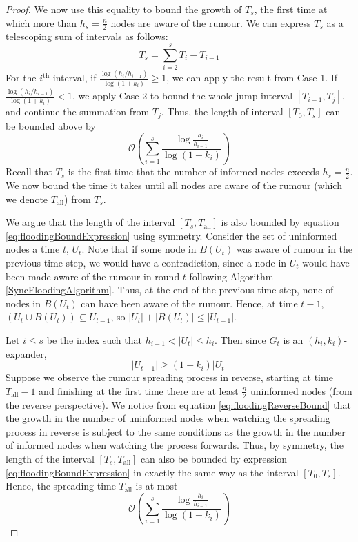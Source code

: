 \begin{proof}
	We now use this equality to bound the growth of $T_s$, the first time at which more than $h_s = \frac{n}{2}$ nodes are aware of the rumour. We can express $T_s$ as a telescoping sum of intervals as follows:
	$$
		T_s = \sum_{i=2}^s T_i - T_{i-1}
	$$
	For the $i^\text{th}$ interval, if $\frac{\log (h_i/h_{i-1})}{\log(1+k_i)} \geq 1$, we can apply the result from Case 1. If $\frac{\log (h_i/h_{i-1})}{\log(1+k_i)} < 1$, we apply Case 2 to bound the whole jump interval $[T_{i-1}, T_j]$, and continue the summation from $T_j$.
	Thus, the length of interval $[T_0, T_s]$ can be bounded above by
	\begin{equation}\label{eq:floodingBoundExpression}
		\mathcal{O}\left(\sum_{i=1}^s \frac{\log \frac{h_i}{h_{i-1}}}{\log(1+k_i)}\right)
	\end{equation}
	Recall that $T_s$ is the first time that the number of informed nodes exceeds $h_s = \frac{n}{2}$. We now bound the time it takes until all nodes are aware of the rumour (which we denote $T_\text{all}$) from $T_s$.

	We argue that the length of the interval $[T_s, T_\text{all}]$ is also bounded by equation \ref{eq:floodingBoundExpression} using symmetry. Consider the set of uninformed nodes a time $t$, $U_t$. Note that if some node in $B(U_t)$ was aware of rumour in the previous time step, we would have a contradiction, since a node in $U_t$ would have been made aware of the rumour in round $t$ following Algorithm \ref{SyncFloodingAlgorithm}.
	Thus, at the end of the previous time step, none of nodes in $B(U_t)$ can have been aware of the rumour.
	Hence, at time $t-1$, $(U_t \cup B(U_t)) \subseteq U_{t-1}$, so $|U_t| + |B(U_t)| \leq |U_{t-1}|$.
	
	Let $i \leq s$ be the index such that $h_{i-1}< |U_t| \leq h_i$. Then since $G_t$ is an $(h_i, k_i)$-expander, 
	\begin{equation} \label{eq:floodingReverseBound}
		|U_{t-1}| \geq (1 + k_i)|U_t|
	\end{equation}
	Suppose we observe the rumour spreading process in reverse, starting at time $T_\text{all} - 1$ and finishing at the first time there are at least $\frac{n}{2}$ uninformed nodes (from the reverse perspective). We notice from equation \ref{eq:floodingReverseBound} that the growth in the number of uninformed nodes when watching the spreading process in reverse is subject to the same conditions as the growth in the number of informed nodes when watching the process forwards. Thus, by symmetry, the length of the interval $[T_s, T_\text{all}]$ can also be bounded by expression \ref{eq:floodingBoundExpression} in exactly the same way as the interval $[T_0, T_s]$. Hence, the spreading time $T_\text{all}$ is at most
	$$
		\mathcal{O}\left(\sum_{i=1}^s \frac{\log \frac{h_i}{h_{i-1}}}{\log(1+k_i)}\right)
	$$
\end{proof}

